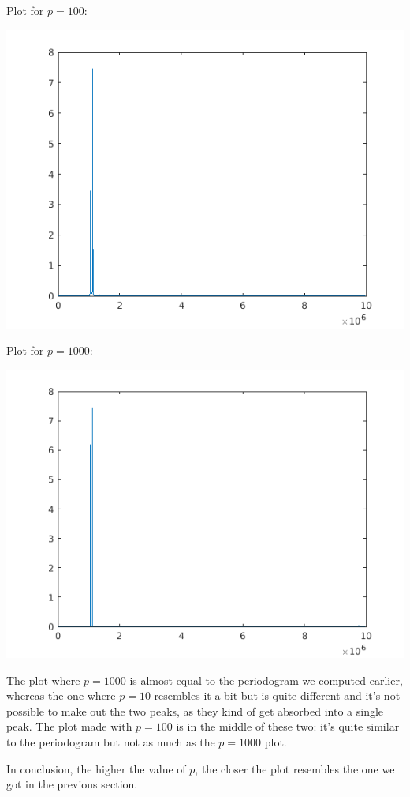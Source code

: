 \documentclass[conference,9pt]{IEEEtran}
\begin{document}
Plot for $p=100$:

\includegraphics[scale=0.6]{p100}

Plot for $p=1000$:

\includegraphics[scale=0.6]{p1000}

The plot where $p=1000$ is almost equal to the periodogram we computed earlier, whereas the one where $p=10$ resembles it a bit but is quite different and it's not possible to make out the two peaks, as they kind of get absorbed into a single peak. The plot made with $p=100$ is in the middle of these two: it's quite similar to the periodogram but not as much as the $p=1000$ plot.

In conclusion, the higher the value of $p$, the closer the plot resembles the one we got in the previous section.
\end{document}
